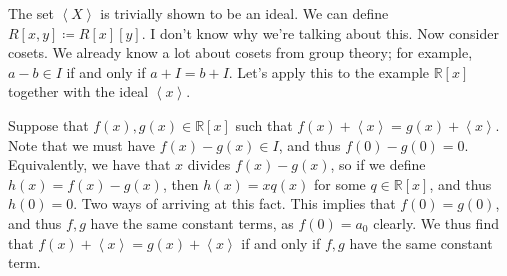 The set $\left\langle X \right\rangle $ is trivially shown to be an ideal. We can define $R[x,y]\coloneqq R[x][y]$. I don't know why we're talking about this. Now consider cosets. We already know a lot about cosets from group theory; for example, $a-b\in I$ if and only if $a+I=b+I$. Let's apply this to the example $\mathbb{R} [x]$ together with the ideal $\left\langle x \right\rangle $.

Suppose that $f(x),g(x)\in\mathbb{R} [x]$ such that $f(x)+\left\langle x \right\rangle =g(x)+\left\langle x \right\rangle $. Note that we must have $f(x)-g(x)\in I$, and thus $f(0)-g(0)=0$. Equivalently, we have that $x$ divides $f(x)-g(x)$, so if we define $h(x)=f(x)-g(x)$, then $h(x)=xq(x)$ for some $q\in\mathbb{R} [x]$, and thus $h(0)=0$. Two ways of arriving at this fact. This implies that $f(0)=g(0)$, and thus $f,g$ have the same constant terms, as $f(0)=a_0$ clearly. We thus find that $f(x)+\left\langle x \right\rangle =g(x)+\left\langle x \right\rangle $ if and only if $f,g$ have the same constant term.
